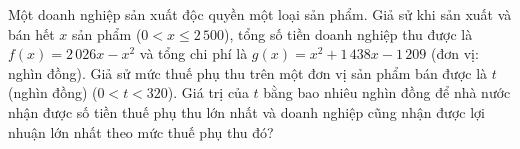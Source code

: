 \begin{ex}%
	Một doanh nghiệp sản xuất độc quyền một loại sản phẩm. Giả sử khi sản xuất và bán hết $x$ sản phẩm ($0 < x \le 2\,500$), tổng số tiền doanh nghiệp thu được là $f(x) = 2\,026x - x^2$ và tổng chi phí là $g(x) = x^2 + 1\,438x - 1\,209$ (đơn vị: nghìn đồng). Giả sử mức thuế phụ thu trên một đơn vị sản phẩm bán được là $t$ (nghìn đồng) ($0 < t < 320$). Giá trị của $t$ bằng bao nhiêu nghìn đồng để nhà nước nhận được số tiền thuế phụ thu lớn nhất và doanh nghiệp cũng nhận được lợi nhuận lớn nhất theo mức thuế phụ thu đó?
	\par{}
\end{ex}

